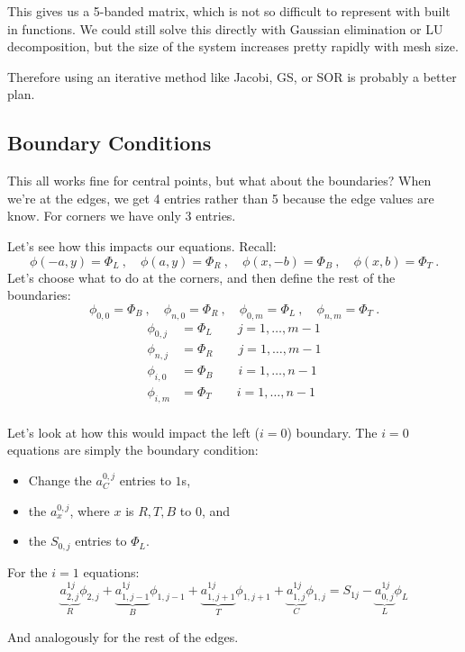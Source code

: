 \documentclass[12pt]{article}
\begin{document}
This gives us a 5-banded matrix, which is not so difficult to represent with built in functions. We could still solve this directly with Gaussian elimination or LU decomposition, but the size of the system increases pretty rapidly with mesh size.

Therefore using an iterative method like Jacobi, GS, or SOR is probably a better plan. 


\subsection{Boundary Conditions}

This all works fine for central points, but what about the boundaries? When we're at the edges, we get 4 entries rather than 5 because the edge values are know. For corners we have only 3 entries. 

Let's see how this impacts our equations. Recall:
%
\[\phi(-a,y) = \Phi_L\:, \quad \phi(a,y) = \Phi_R\:, \quad \phi(x,-b) = \Phi_B\:, \quad \phi(x,b) = \Phi_T\:.\]
%
Let's choose what to do at the corners, and then define the rest of the boundaries:
\[\phi_{0,0} = \Phi_B\:, \quad \phi_{n,0} = \Phi_R\:, \quad \phi_{0,m} = \Phi_L\:, \quad \phi_{n,m} = \Phi_T\:.\]
%
\begin{align}
\phi_{0,j} &= \Phi_L \qquad j=1,\dots,m-1 \nonumber \\
\phi_{n,j} &= \Phi_R \qquad j=1,\dots,m-1 \nonumber \\
\phi_{i,0} &= \Phi_B \qquad i=1,\dots,n-1 \nonumber \\
\phi_{i,m} &= \Phi_T \qquad i=1,\dots,n-1 \nonumber \\
\end{align}

Let's look at how this would impact the left ($i=0$) boundary. The $i=0$ equations are simply the boundary condition:
\begin{itemize}
\item Change the $a_{C}^{0,j}$ entries to $1$s, 
\item the $a_{x}^{0,j}$, where $x$ is $R, T, B$ to $0$, and 
\item the $S_{0,j}$ entries to $\Phi_L$.
\end{itemize} 

For the $i=1$ equations:
\[\underbrace{a_{2,j}^{1j}}_{R}\phi_{2,j} + \underbrace{a_{1,j-1}^{1j}}_{B}\phi_{1,j-1} + \underbrace{a_{1,j+1}^{1j}}_{T}\phi_{1,j+1} + \underbrace{a_{1,j}^{1j}}_{C}\phi_{1,j} = S_{1j} - \underbrace{a_{0,j}^{1j}}_{L}\phi_L \]

And analogously for the rest of the edges.

%
% 
\end{document}
